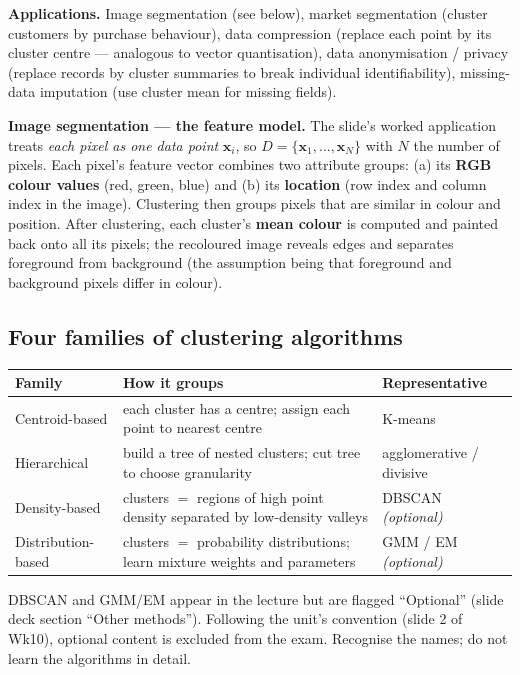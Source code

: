 \documentclass[11pt, a4paper]{article}
\newcommand{\thead}[1]{\textbf{#1}}
\begin{document}
\textbf{Applications.} Image segmentation (see below), market segmentation (cluster customers by purchase behaviour), data compression (replace each point by its cluster centre — analogous to vector quantisation), data anonymisation / privacy (replace records by cluster summaries to break individual identifiability), missing-data imputation (use cluster mean for missing fields).

\textbf{Image segmentation — the feature model.} The slide's worked application treats \emph{each pixel as one data point} $\mathbf{x}_i$, so $D = \{\mathbf{x}_1, \ldots, \mathbf{x}_N\}$ with $N$ the number of pixels. Each pixel's feature vector combines two attribute groups: (a) its \textbf{RGB colour values} (red, green, blue) and (b) its \textbf{location} (row index and column index in the image). Clustering then groups pixels that are similar in colour and position. After clustering, each cluster's \textbf{mean colour} is computed and painted back onto all its pixels; the recoloured image reveals edges and separates foreground from background (the assumption being that foreground and background pixels differ in colour).

\subsection{Four families of clustering algorithms}

\begin{tabularx}{\linewidth}{@{}lXX@{}}
\toprule
\thead{Family} & \thead{How it groups} & \thead{Representative} \\
\midrule
Centroid-based   & each cluster has a centre; assign each point to nearest centre & K-means \\
Hierarchical     & build a tree of nested clusters; cut tree to choose granularity & agglomerative / divisive \\
Density-based    & clusters $=$ regions of high point density separated by low-density valleys & DBSCAN \emph{(optional)} \\
Distribution-based & clusters $=$ probability distributions; learn mixture weights and parameters & GMM / EM \emph{(optional)} \\
\bottomrule
\end{tabularx}

\begin{notebox}
DBSCAN and GMM/EM appear in the lecture but are flagged ``Optional'' (slide deck section ``Other methods''). Following the unit's convention (slide 2 of Wk10), optional content is excluded from the exam. Recognise the names; do not learn the algorithms in detail.
\end{notebox}
\end{document}
